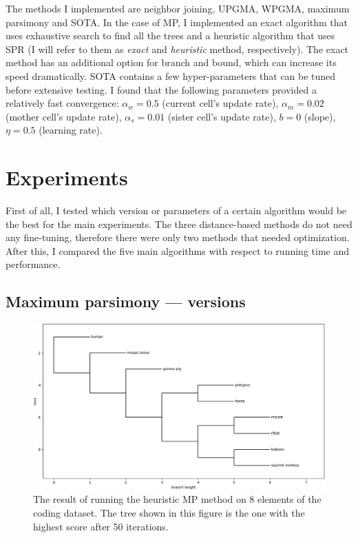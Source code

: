 \documentclass[11pt,twocolumn]{article}
\begin{document}
The methods I implemented are neighbor joining, UPGMA, WPGMA, maximum parsimony and SOTA. In the case of MP, I implemented an exact algorithm that uses exhaustive search to find all the trees and a heuristic algorithm that uses SPR (I will refer to them as \textit{exact} and \textit{heuristic} method, respectively). The exact method has an additional option for branch and bound, which can increase its speed dramatically. SOTA contains a few hyper-parameters that can be tuned before extensive testing. I found that the following parameters provided a relatively fast convergence: $\alpha_w = 0.5$ (current cell's update rate), $\alpha_m = 0.02$ (mother cell's update rate), $\alpha_s = 0.01$ (sister cell's update rate), $b = 0$ (slope), $\eta = 0.5$ (learning rate).

\section{Experiments}

First of all, I tested which version or parameters of a certain algorithm would be the best for the main experiments. The three distance-based methods do not need any fine-tuning, therefore there were only two methods that needed optimization. After this, I compared the five main algorithms with respect to running time and performance.

\subsection{Maximum parsimony — versions}

\begin{figure}
	\centering
	\includegraphics[width=0.85\linewidth]{img/mp_9_taxa_heuristic.png}
	\caption{The result of running the heuristic MP method on 8 elements of the coding dataset. The tree shown in this figure is the one with the highest score after 50 iterations.}
	\label{fig:mp_8_taxa_heuristic}
\end{figure}
\end{document}
